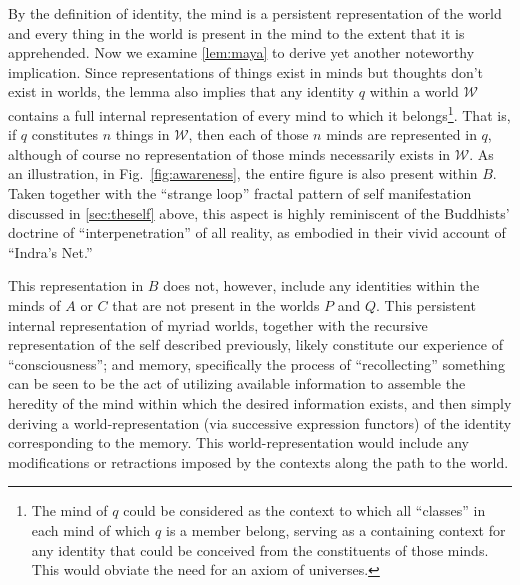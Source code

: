 \documentclass[pra,twocolumn,groupedaddress,10pt]{revtex4}
\theoremstyle{definition}
\begin{document}
By the definition of identity, the mind is a persistent representation of the world and every thing in the world is present in the mind to the extent that it is apprehended. Now we examine \autoref{lem:maya} to derive yet another noteworthy implication. Since representations of things exist in minds but thoughts don't exist in worlds, the lemma also implies that any identity $q$ within a world $\mathcal{W}$ contains a full internal representation of every mind to which it belongs\footnote{The mind of $q$ could be considered as the context to which all ``classes'' in each mind of which $q$ is a member belong, serving as a containing context for any identity that could be conceived from the constituents of those minds. This would obviate the need for an axiom of universes.}. That is, if $q$ constitutes $n$ things in $\mathcal{W}$, then each of those $n$ minds are represented in $q$, although of course no representation of those minds necessarily exists in $\mathcal{W}$. As an illustration, in Fig.~\ref{fig:awareness}, the entire figure is also present within $B$. Taken together with the ``strange loop'' fractal pattern of self manifestation discussed in \autoref{sec:theself} above, this aspect is highly reminiscent of the Buddhists' doctrine of ``interpenetration'' of all reality, as embodied in their vivid account of ``Indra's Net.''\cite{avatamsaka}

This representation in $B$ does not, however, include any identities within the minds of $A$ or $C$ that are not present in the worlds $P$ and $Q$. This persistent internal representation of myriad worlds, together with the recursive representation of the self described previously, likely constitute our experience of ``consciousness''; and memory, specifically the process of ``recollecting'' something can be seen to be the act of utilizing available information to assemble the heredity of the mind within which the desired information exists, and then simply deriving a world-representation (via successive expression functors) of the identity corresponding to the memory. This world-representation would include any modifications or retractions imposed by the contexts along the path to the world.
\end{document}

